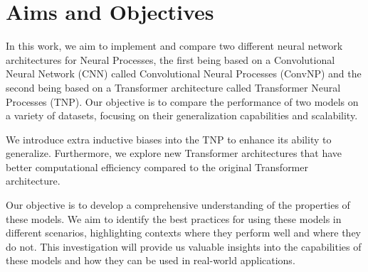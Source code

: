 \documentclass[../../main.tex]{subfiles}
\begin{document}
\section{Aims and Objectives}

In this work, we aim to implement and compare two different neural network architectures for Neural Processes, the first being based on a Convolutional Neural Network (CNN) called Convolutional Neural Processes (ConvNP) and the second being based on a Transformer architecture called Transformer Neural Processes (TNP). Our objective is to compare the performance of two models on a variety of datasets, focusing on their generalization capabilities and scalability.

We introduce extra inductive biases into the TNP to enhance its ability to generalize. Furthermore, we explore new Transformer architectures that have better computational efficiency compared to the original Transformer architecture.

Our objective is to develop a comprehensive understanding of the properties of these models. We aim to identify  the best practices for using these models in different scenarios, highlighting contexts where they perform well and where they do not. This investigation will provide us valuable insights into the capabilities of these models and how they can be used in real-world applications.





\ifSubfilesClassLoaded{%
    \printbibliography{}
}{} 
\end{document}
